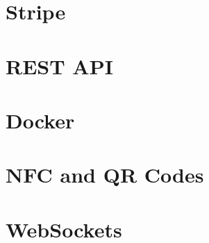 \section{Stripe}
\label{sec:stripe}


\section{REST API}
\label{sec:rest-api}


\section{Docker}
\label{sec:docker}


\section{NFC and QR Codes}
\label{sec:nfc-qr}


\section{WebSockets}
\label{sec:websockets}

